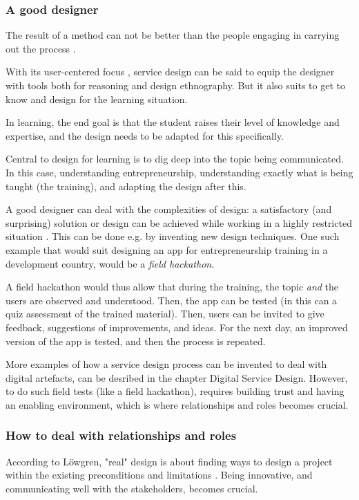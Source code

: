 \subsubsection{A good designer}

The result of a method can not be better than the people engaging in carrying out the process \citep{lowgren}.

With its user-centered focus \citep{stickdorn}, service design can be said to equip the designer with tools both for reasoning and design ethnography. But it also suits to get to know and design for the learning situation.

In learning, the end goal is that the student raises their level of knowledge and expertise, and the design needs to be adapted for this specifically.

Central to design for learning is to dig deep into the topic being communicated. In this case, understanding entrepreneurship, understanding exactly what is being taught (the training), and adapting the design after this.

A good designer can deal with the complexities of design: a satisfactory (and surprising) solution or design can be achieved while working in a highly restricted situation \citep{lowgren}. This can be done e.g. by inventing new design techniques. One such example that would suit designing an app for entrepreneurship training in a development country, would be a \textit{field hackathon}.

A field hackathon would thus allow that during the training, the topic \textit{and} the users are observed and understood. Then, the app can be tested (in this can a quiz assessment of the trained material). Then, users can be invited to give feedback, suggestions of improvements, and  ideas. For the next day, an improved version of the app is tested, and then the process is repeated.

More examples of how a service design process can be invented to deal with digital artefacts, can be desribed in the chapter Digital Service Design. However, to do such field tests (like a field hackathon), requires building trust and having an enabling environment, which is where relationships and roles becomes crucial.

\subsubsection{How to deal with relationships and roles}
According to Löwgren, "real" design is about finding ways to design a project within the existing preconditions and limitations \citep{lowgren}. Being innovative, and communicating well with the stakeholders, becomes crucial.

